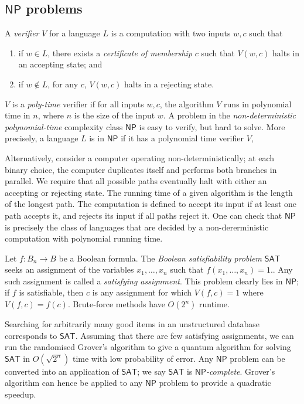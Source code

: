 \subsection{\texorpdfstring{\( \mathsf{NP} \)}{NP} problems}
A \emph{verifier} \( V \) for a language \( L \) is a computation with two inputs \( w, c \) such that
\begin{enumerate}
    \item if \( w \in L \), there exists a \emph{certificate of membership} \( c \) such that \( V(w,c) \) halts in an accepting state; and
    \item if \( w \not\in L \), for any \( c \), \( V(w,c) \) halts in a rejecting state.
\end{enumerate}
\( V \) is a \emph{poly-time} verifier if for all inputs \( w, c \), the algorithm \( V \) runs in polynomial time in \( n \), where \( n \) is the size of the input \( w \).
A problem in the \emph{non-deterministic polynomial-time} complexity class \( \mathsf{NP} \) is easy to verify, but hard to solve.
More precisely, a language \( L \) is in \( \mathsf{NP} \) if it has a polynomial time verifier \( V \),

Alternatively, consider a computer operating non-deterministically; at each binary choice, the computer duplicates itself and performs both branches in parallel.
We require that all possible paths eventually halt with either an accepting or rejecting state.
The running time of a given algorithm is the length of the longest path.
The computation is defined to accept its input if at least one path accepts it, and rejects its input if all paths reject it.
One can check that \( \mathsf{NP} \) is precisely the class of languages that are decided by a non-dererministic computation with polynomial running time.

Let \( f \colon B_n \to B \) be a Boolean formula.
The \emph{Boolean satisfiability problem} \( \mathsf{SAT} \) seeks an assignment of the variables \( x_1, \dots, x_n \) such that \( f(x_1, \dots, x_n) = 1 \)..
Any such assignment is called a \emph{satisfying assignment}.
This problem clearly lies in \( \mathsf{NP} \); if \( f \) is satisfiable, then \( c \) is any assignment for which \( V(f,c) = 1 \) where \( V(f,c) = f(c) \).
Brute-force methods have \( O(2^n) \) runtime.

Searching for arbitrarily many good items in an unstructured database corresponds to \( \mathsf{SAT} \).
Assuming that there are few satisfying assignments, we can run the randomised Grover's algorithm to give a quantum algorithm for solving \( \mathsf{SAT} \) in \( O(\sqrt{2^n}) \) time with low probability of error.
Any \( \mathsf{NP} \) problem can be converted into an application of \( \mathsf{SAT} \); we say \( \mathsf{SAT} \) is \emph{\( \mathsf{NP} \)-complete}.
Grover's algorithm can hence be applied to any \( \mathsf{NP} \) problem to provide a quadratic speedup.

